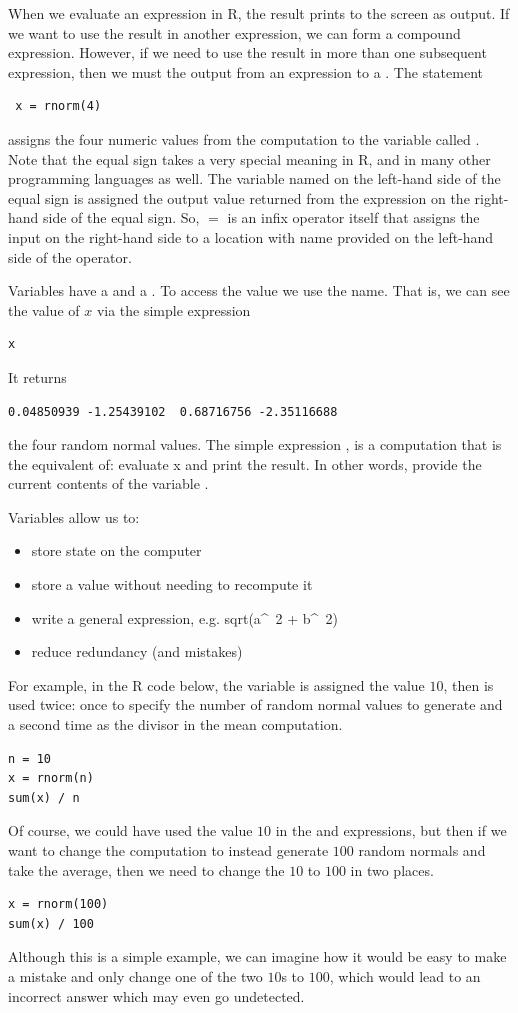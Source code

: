 When we evaluate an expression in R, the result prints to the screen
as output.  If we want to use the result in another expression, we can
form a compound expression.  However, if we need to use the result in
more than one subsequent expression, then we must  the
output from an expression to a . The statement 
\begin{verbatim}
 x = rnorm(4)
\end{verbatim} 
assigns the four numeric values from the  computation to the variable
called .  Note that the equal sign takes a very special
meaning in R, and in many other programming languages as well.  The
variable named on the left-hand side of the equal sign is assigned the
output value returned from the expression on the right-hand side of
the equal sign. So, $=$ is an infix operator itself that assigns the
input on the right-hand side to a location with name provided on the
left-hand side of the operator.

Variables have a  and a .  To access the value we
use the name.  That is, we can see the value of $x$ via the simple
expression
\begin{verbatim}
x
\end{verbatim}
It returns
\begin{verbatim}
0.04850939 -1.25439102  0.68716756 -2.35116688
\end{verbatim}
the four random normal values.  The simple expression , is a
computation that is the equivalent of: evaluate x and print the
result.  In other words, provide the current contents of the variable
.

Variables allow us to:
\begin{itemize}
\item store state on the computer
\item store a value without needing to recompute it
\item write a general expression, e.g. sqrt(a\^~2 + b\^~2)
\item reduce redundancy (and mistakes)
\end{itemize}
For example, in the R code below, the variable  is
assigned the value $10$, then  is used twice: once to
specify the number of random normal values to generate and a second
time as the divisor in the mean computation.
\begin{verbatim}
n = 10
x = rnorm(n)
sum(x) / n
\end{verbatim}
Of course, we could have used the value $10$ in the  and
 expressions, but then if we want to change the computation
to instead generate $100$ random normals and take the average, then we
need to change the $10$ to $100$ in two places.
\begin{verbatim}
x = rnorm(100)
sum(x) / 100
\end{verbatim}
Although this is a simple example, we can imagine how it would be easy
to make a mistake and only change one of the two $10$s to $100$, which
would lead to an incorrect answer which may even go undetected.

